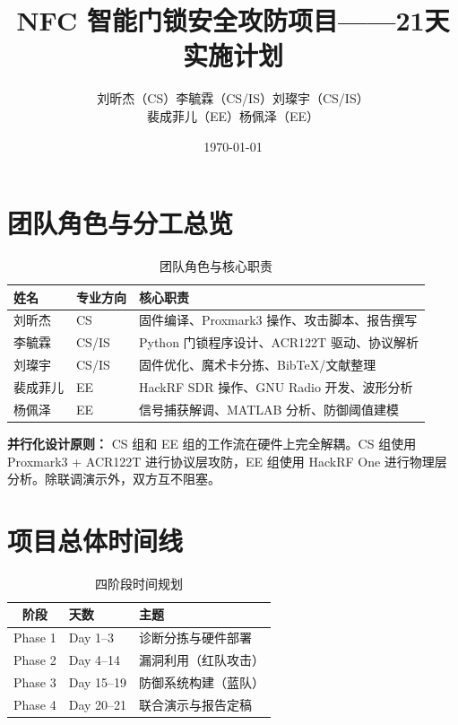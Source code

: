 \documentclass[12pt,a4paper]{ctexart}
\title{\textbf{NFC 智能门锁安全攻防项目——21天实施计划}}
\author{刘昕杰（CS）\quad 李毓霖（CS/IS）\quad 刘璨宇（CS/IS）\\裴成菲儿（EE）\quad 杨佩泽（EE）}
\date{\today}
\begin{document}
\maketitle
\tableofcontents
\newpage

\section{团队角色与分工总览}

\begin{table}[h]
\centering
\caption{团队角色与核心职责}
\begin{tabular}{lll}
\toprule
\textbf{姓名} & \textbf{专业方向} & \textbf{核心职责} \\
\midrule
刘昕杰 & CS & 固件编译、Proxmark3 操作、攻击脚本、报告撰写 \\
李毓霖 & CS/IS & Python 门锁程序设计、ACR122T 驱动、协议解析 \\
刘璨宇 & CS/IS & 固件优化、魔术卡分拣、BibTeX/文献整理 \\
裴成菲儿 & EE & HackRF SDR 操作、GNU Radio 开发、波形分析 \\
杨佩泽 & EE & 信号捕获解调、MATLAB 分析、防御阈值建模 \\
\bottomrule
\end{tabular}
\end{table}

\vskip 12pt
\noindent\textbf{并行化设计原则：} CS 组和 EE 组的工作流在硬件上完全解耦。CS 组使用 Proxmark3 + ACR122T 进行协议层攻防，EE 组使用 HackRF One 进行物理层分析。除联调演示外，双方互不阻塞。

\section{项目总体时间线}

\begin{table}[h]
\centering
\caption{四阶段时间规划}
\begin{tabular}{cll}
\toprule
\textbf{阶段} & \textbf{天数} & \textbf{主题} \\
\midrule
Phase 1 & Day 1--3  & 诊断分拣与硬件部署 \\
Phase 2 & Day 4--14 & 漏洞利用（红队攻击） \\
Phase 3 & Day 15--19& 防御系统构建（蓝队） \\
Phase 4 & Day 20--21& 联合演示与报告定稿 \\
\bottomrule
\end{tabular}
\end{table}
\end{document}
